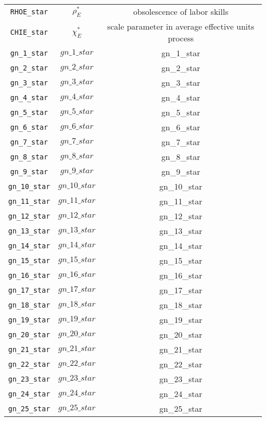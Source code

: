 \begin{center}
\begin{longtable}{ccc}
\texttt{RHOE\_star} & ${\rho_E^*}$ & obsolescence of labor skills\\
\texttt{CHIE\_star} & ${\chi_E^*}$ & scale parameter in average effective units process\\
\texttt{gn\_1\_star} & $gn\_1\_star$ & gn\_1\_star\\
\texttt{gn\_2\_star} & $gn\_2\_star$ & gn\_2\_star\\
\texttt{gn\_3\_star} & $gn\_3\_star$ & gn\_3\_star\\
\texttt{gn\_4\_star} & $gn\_4\_star$ & gn\_4\_star\\
\texttt{gn\_5\_star} & $gn\_5\_star$ & gn\_5\_star\\
\texttt{gn\_6\_star} & $gn\_6\_star$ & gn\_6\_star\\
\texttt{gn\_7\_star} & $gn\_7\_star$ & gn\_7\_star\\
\texttt{gn\_8\_star} & $gn\_8\_star$ & gn\_8\_star\\
\texttt{gn\_9\_star} & $gn\_9\_star$ & gn\_9\_star\\
\texttt{gn\_10\_star} & $gn\_10\_star$ & gn\_10\_star\\
\texttt{gn\_11\_star} & $gn\_11\_star$ & gn\_11\_star\\
\texttt{gn\_12\_star} & $gn\_12\_star$ & gn\_12\_star\\
\texttt{gn\_13\_star} & $gn\_13\_star$ & gn\_13\_star\\
\texttt{gn\_14\_star} & $gn\_14\_star$ & gn\_14\_star\\
\texttt{gn\_15\_star} & $gn\_15\_star$ & gn\_15\_star\\
\texttt{gn\_16\_star} & $gn\_16\_star$ & gn\_16\_star\\
\texttt{gn\_17\_star} & $gn\_17\_star$ & gn\_17\_star\\
\texttt{gn\_18\_star} & $gn\_18\_star$ & gn\_18\_star\\
\texttt{gn\_19\_star} & $gn\_19\_star$ & gn\_19\_star\\
\texttt{gn\_20\_star} & $gn\_20\_star$ & gn\_20\_star\\
\texttt{gn\_21\_star} & $gn\_21\_star$ & gn\_21\_star\\
\texttt{gn\_22\_star} & $gn\_22\_star$ & gn\_22\_star\\
\texttt{gn\_23\_star} & $gn\_23\_star$ & gn\_23\_star\\
\texttt{gn\_24\_star} & $gn\_24\_star$ & gn\_24\_star\\
\texttt{gn\_25\_star} & $gn\_25\_star$ & gn\_25\_star\\

\end{longtable}
\end{center}

